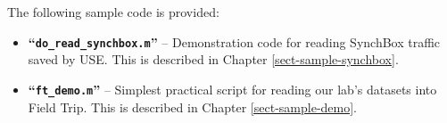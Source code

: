 The following sample code is provided:
\begin{itemize}
%
\item \textbf{``\texttt{do\_read\_synchbox.m}''} -- Demonstration code for
reading SynchBox traffic saved by USE. This is described in Chapter
\ref{sect-sample-synchbox}.
%
\item \textbf{``\texttt{ft\_demo.m}''} -- Simplest practical script for
reading our lab's datasets into Field Trip. This is described in Chapter
\ref{sect-sample-demo}.
%
\end{itemize}

%
